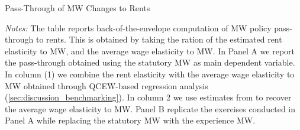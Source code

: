\begin{table}[!h] 
	\centering
	\caption{Pass-Through of MW Changes to Rents}
	\label{tab:passthrough}  
	
	\begin{minipage}{\textwidth} \footnotesize
		\vspace{2mm}
		\textit{Notes:} The table reports back-of-the-envelope computation of MW 
		policy pass-through to rents. This is obtained by taking the ration of the 
		estimated rent elasticity to MW, and the average wage elasticity to MW. 
		In Panel A we report the pass-through obtained using the statutory MW as 
		main dependent variable. In column (1) we combine the rent elasticity with 
		the average wage elasticity to MW obtained through QCEW-based regression
		analysis (\autoref{sec:discussion_benchmarking}). In column 2 we use estimates
		from \textcite{CegnizEtAl2019} to recover the average wage elasticity to MW. 
		Panel B replicate the exercises conducted in Panel A while replacing the statutory
		MW with the experience MW. 
	\end{minipage}
\end{table}

